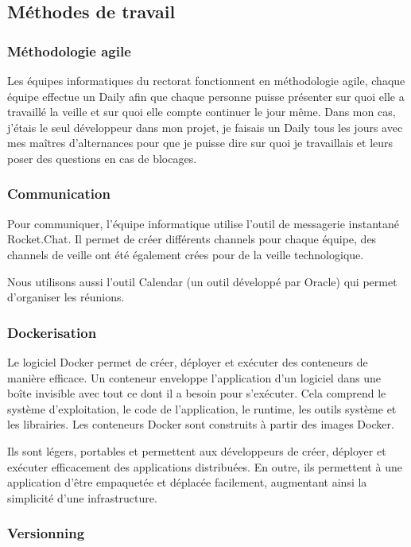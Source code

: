 \documentclass[12pt]{article}
\begin{document}
\subsection{Méthodes de travail}
\subsubsection{Méthodologie agile}

Les équipes informatiques du rectorat fonctionnent en méthodologie agile, chaque équipe effectue un Daily afin que chaque personne puisse présenter sur quoi elle a travaillé la veille et sur quoi elle compte continuer le jour même. Dans mon cas, j'étais le seul développeur dans mon projet, je faisais un Daily tous les jours avec mes maîtres d'alternances pour que je puisse dire sur quoi je travaillais et leurs poser des questions en cas de blocages.

\subsubsection{Communication}

Pour communiquer, l'équipe informatique utilise l'outil de messagerie instantané Rocket.Chat. Il permet de créer différents
channels pour chaque équipe, des channels de veille ont été également crées pour de la veille technologique.

Nous utilisons aussi l'outil Calendar (un outil développé par Oracle) qui permet d’organiser les réunions.

\subsubsection{Dockerisation}

Le logiciel Docker permet de créer, déployer et exécuter des conteneurs de manière efficace. Un conteneur enveloppe l’application d’un logiciel dans une boîte invisible avec tout ce dont il a besoin pour s’exécuter. Cela comprend le
système d’exploitation, le code de l’application, le runtime, les outils système et les librairies. Les conteneurs Docker sont construits à partir des images Docker.

Ils sont légers, portables et permettent aux développeurs de créer, déployer et exécuter efficacement des applications distribuées. En outre, ils permettent à une application d’être empaquetée et déplacée facilement, augmentant ainsi la simplicité d’une infrastructure.

\subsubsection{Versionning}
\end{document}

